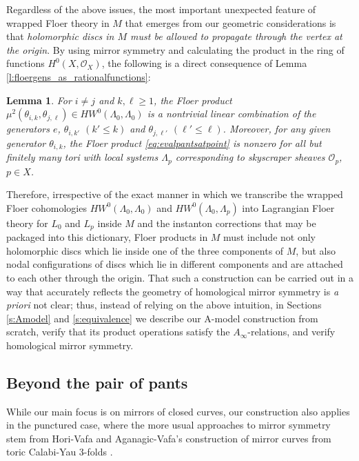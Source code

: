 \documentclass[11pt,leqno]{amsart}
\newtheorem{lemma}[theo]{Lemma}
\numberwithin{equation}{section}
\def\O{{\mathcal O}}
\begin{document}
Regardless of the above issues, the most important unexpected feature of
wrapped Floer theory in $M$ that emerges from our geometric considerations
is that {\em holomorphic discs in $M$ must be allowed to propagate through
the vertex at the origin}. By using mirror symmetry and calculating the
product in the ring of functions $H^0(X,\O_X)$, the following is a direct
consequence of Lemma \ref{l:floergens_as_rationalfunctions}:

\begin{lemma}
For $i\neq j$ and $k,\ell\geq 1$, the Floer product $\mu^2(\theta_{i,k},
\theta_{j,\ell})\in HW^0(\Lambda_0,\Lambda_0)$ is a nontrivial linear combination of
the generators $e$, $\theta_{i,k'}$ $(k'\leq k)$ and $\theta_{j,\ell'}$
$(\ell'\leq \ell)$.
Moreover, for any given generator $\theta_{i,k}$, the Floer product 
\eqref{eq:evalpantsatpoint} is nonzero for all but finitely many tori with
local systems $\Lambda_p$ corresponding to skyscraper sheaves $\O_p$, $p\in X$.
\end{lemma}

Therefore, irrespective of the exact manner in which
we transcribe the wrapped Floer cohomologies $HW^0(\Lambda_0,\Lambda_0)$ and 
$HW^0(\Lambda_0,\Lambda_p)$ into Lagrangian Floer theory for $L_0$ and $L_p$
inside $M$ and the instanton corrections that may be packaged into this
dictionary, Floer products in $M$ must include not
only holomorphic discs which lie inside one of the three components of $M$,
but also nodal configurations of discs which lie in different components and
are attached to each other through the origin. That such a construction can
be carried out in a way that accurately reflects the geometry of 
homological mirror symmetry is {\em a priori} not clear; thus, instead of
relying on the above intuition, in Sections \ref{s:Amodel} and
\ref{s:equivalence} we describe our 
A-model construction from scratch, verify that its product operations 
satisfy the $A_\infty$-relations, and verify homological mirror symmetry.

\subsection{Beyond the pair of pants}

While our main focus is on mirrors of closed curves, our construction 
also applies in the punctured case, where the more usual approaches to
mirror symmetry stem from Hori-Vafa and Aganagic-Vafa's
construction of mirror curves from toric Calabi-Yau 3-folds \cite{HoriVafa,AV}.
\end{document}
